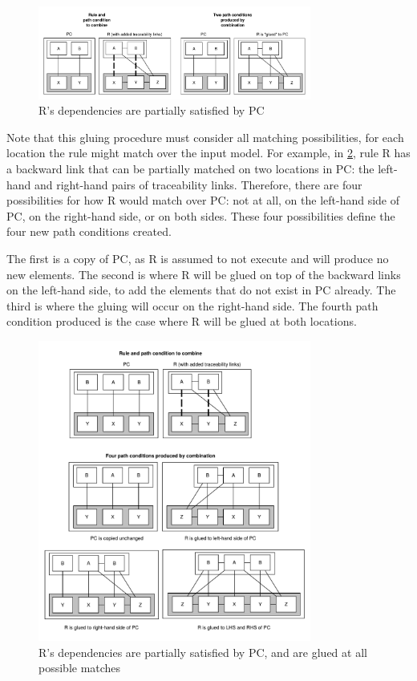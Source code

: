 \begin{figure}[tb] \centering \includegraphics[width=0.8\textwidth]{./figures/building_path_conditions/partial_satisfied_dependencies.pdf}
	\caption{R's dependencies are partially satisfied by PC}
	\label{fig:partial_satisfied_dependencies}
\end{figure}

Note that this gluing procedure must consider all matching possibilities, for each location the rule might match over the input model. For example, in \cref{fig:multiple_partial_satisfied_dependencies}, rule R has a backward link that can be partially matched on two locations in PC: the left-hand and right-hand pairs of traceability links. Therefore, there are four possibilities for how R would match over PC: not at all, on the left-hand side of PC, on the right-hand side, or on both sides. These four possibilities define the four new path conditions created.

The first is a copy of PC, as R is assumed to not execute and will produce no new elements. The second is where R will be glued on top of the backward links on the left-hand side, to add the elements that do not exist in PC already. The third is where the gluing will occur on the right-hand side. The fourth path condition produced is the case where R will be glued at both locations. 


\begin{figure}[tb] \centering \includegraphics[width=0.8\textwidth]{./figures/building_path_conditions/multiple_partial_satisfied_dependencies.pdf}
	\caption{R's dependencies are partially satisfied by PC, and are glued at all possible matches}
	\label{fig:multiple_partial_satisfied_dependencies}
\end{figure}


